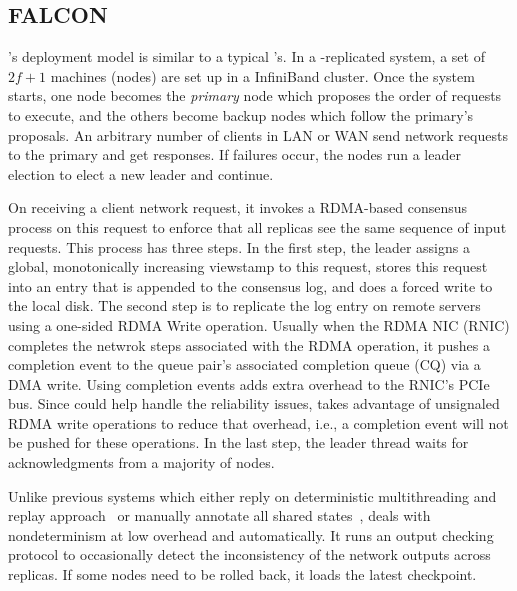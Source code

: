 \subsection{FALCON} \label{sec:falcon}

\smrsystem's deployment model is similar to a typical \smr's. In a \smrsystem-replicated 
system, a set of $2f+1$ machines (nodes) are set up in a InfiniBand cluster. Once the 
\smrsystem system starts, one node becomes the \emph{primary} node which proposes the order of 
requests to execute, and the others become backup nodes which follow the primary’s 
proposals. An arbitrary number of clients in LAN or WAN send network requests to the 
primary and get responses. If failures occur, the nodes run a leader election to elect 
a new leader and continue.

On receiving a client network request, it invokes a RDMA-based consensus process on this 
request to enforce that all replicas see the same sequence of input requests. This process 
has three steps. In the first step, the leader assigns a global, monotonically increasing 
viewstamp to this request, stores this request into an entry that is appended to the consensus 
log, and does a forced write to the local disk. The second step is to replicate the log entry 
on remote servers using a one-sided RDMA Write operation. Usually when the RDMA NIC (RNIC) 
completes the netwrok steps associated with the RDMA operation, it pushes a completion event 
to the queue pair's associated completion queue (CQ) via a DMA write. Using completion events 
adds extra overhead to the RNIC's PCIe bus. Since \paxos could help handle the reliability 
issues, \smrsystem takes advantage of unsignaled RDMA write operations to reduce that overhead, 
i.e., a completion event will not be pushed for these operations. In the last step, the leader 
thread waits for acknowledgments from a majority of nodes.

Unlike previous \smr systems which either reply on deterministic multithreading and replay
approach~\cite{rex:eurosys14} or manually annotate all shared states~\cite{eve:osdi12}, 
\smrsystem deals with nondeterminism at low overhead and automatically. It runs an output 
checking protocol to occasionally detect the inconsistency of the network outputs across replicas. 
If some nodes need to be rolled back, it loads the latest checkpoint. 
